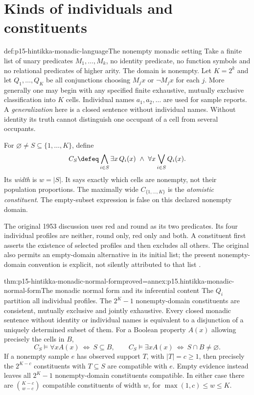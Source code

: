 \section{Kinds of individuals and constituents}
\label{sec:p15-hintikka-constituents}

\begin{hbdefinition}{def:p15-hintikka-monadic-language}{The nonempty monadic setting}
Take a finite list of unary predicates \(M_1,\ldots,M_k\), no identity
predicate, no function symbols and no relational predicates of higher
arity. The domain is nonempty. Let \(K=2^k\) and let
\(Q_1,\ldots,Q_K\) be all conjunctions choosing \(M_jx\) or
\(\neg M_jx\) for each \(j\). More generally one may begin with
any specified finite exhaustive, mutually exclusive classification into
\(K\) cells. Individual names \(a_1,a_2,\ldots\) are used for
sample reports. A \emph{generalization} here is a closed sentence without
individual names. Without identity its truth cannot distinguish one
occupant of a cell from several occupants.

For \(\varnothing\ne S\subseteq\{1,\ldots,K\}\), define
\[
 C_S\defeq
 \bigwedge_{i\in S}\exists x\,Q_i(x)
 \ \land\ \forall x\bigvee_{i\in S}Q_i(x).
\]
Its \emph{width} is \(w=|S|\). It says exactly which cells are
nonempty, not their population proportions. The maximally wide
\(C_{\{1,\ldots,K\}}\) is the \emph{atomistic constituent}.
The empty-subset expression is false on this declared nonempty domain.
\end{hbdefinition}

The original 1953 discussion uses red and round as its two predicates.
Its four individual profiles are neither, round only, red only and both.
A constituent first asserts the existence of selected profiles and then
excludes all others. The original also permits an empty-domain
alternative in its initial list; the present nonempty-domain convention
is explicit, not silently attributed to that list
\cite[sec.~3, subsecs.~16,20, pp.~28--31,37--39]{Hintikka1953DistributiveNormalForms}.

\begin{hbtheorem}{thm:p15-hintikka-monadic-normal-form}{proved=annex:p15.hintikka-monadic-normal-form}{The monadic normal form and its inferential content}
The \(Q_i\) partition all individual profiles. The \(2^K-1\)
nonempty-domain constituents are consistent, mutually exclusive and
jointly exhaustive. Every closed monadic sentence without identity or
individual names is equivalent to a disjunction of a uniquely determined
subset of them. For a Boolean property \(A(x)\) allowing precisely the
cells in \(B\),
\[
 C_S\models\forall x A(x)\ \Longleftrightarrow\ S\subseteq B,
 \qquad
 C_S\models\exists x A(x)\ \Longleftrightarrow\ S\cap B\ne\varnothing.
\]
If a nonempty sample \(e\) has observed support \(T\), with
\(|T|=c\geq1\), then precisely the \(2^{K-c}\) constituents with
\(T\subseteq S\) are compatible with \(e\). Empty evidence instead
leaves all \(2^K-1\) nonempty-domain constituents compatible. In either
case there are \(\binom{K-c}{w-c}\) compatible constituents of width
\(w\), for \(\max(1,c)\leq w\leq K\).
\end{hbtheorem}

